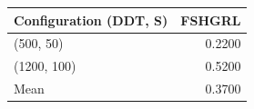 \begin{tabular}{lr}
\toprule
Configuration (DDT, S) & FSHGRL \\
\midrule
(500, 50) & 0.2200 \\
(1200, 100) & 0.5200 \\
Mean & 0.3700 \\
\bottomrule
\end{tabular}
